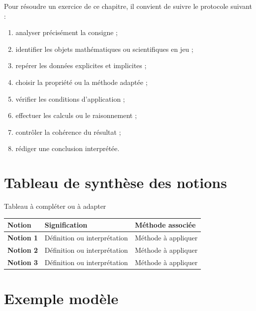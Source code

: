 \documentclass[11pt,a4paper]{article}
\begin{document}
\begin{cadremethode}
Pour résoudre un exercice de ce chapitre, il convient de suivre le protocole suivant :

\begin{enumerate}
    \item analyser précisément la consigne ;
    \item identifier les objets mathématiques ou scientifiques en jeu ;
    \item repérer les données explicites et implicites ;
    \item choisir la propriété ou la méthode adaptée ;
    \item vérifier les conditions d’application ;
    \item effectuer les calculs ou le raisonnement ;
    \item contrôler la cohérence du résultat ;
    \item rédiger une conclusion interprétée.
\end{enumerate}
\end{cadremethode}

\section{Tableau de synthèse des notions}

\begin{cadregris}{Tableau à compléter ou à adapter}
\renewcommand{\arraystretch}{1.35}
\begin{tabularx}{\textwidth}{>{\bfseries}p{3.5cm}X X}
\toprule
Notion & Signification & Méthode associée \\
\midrule
Notion 1 & Définition ou interprétation & Méthode à appliquer \\
Notion 2 & Définition ou interprétation & Méthode à appliquer \\
Notion 3 & Définition ou interprétation & Méthode à appliquer \\
\bottomrule
\end{tabularx}
\end{cadregris}

\section{Exemple modèle}
\end{document}
